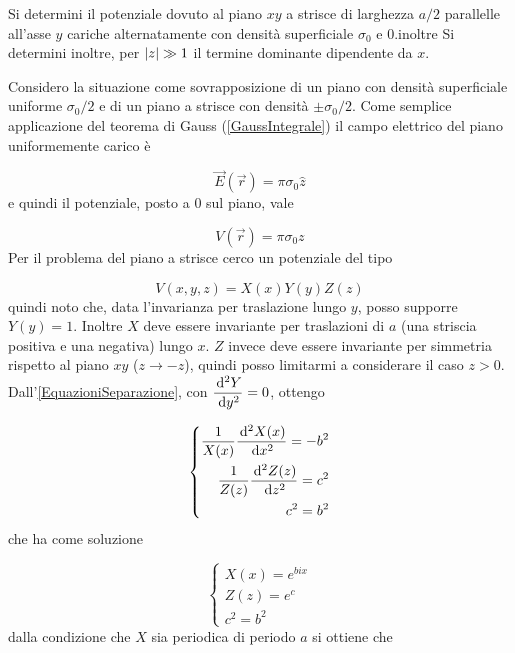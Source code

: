 \documentclass[../main.tex]{subfiles}
\begin{document}

\textex

Si determini il potenziale dovuto al piano $xy$ a strisce di larghezza $a/2$ parallelle all'asse $y$ cariche alternatamente con densità superficiale $\sigma_0$  e $0$.\newline inoltre
Si determini inoltre, per $\lvert z\rvert \gg 1$ il termine dominante dipendente da $x$.

\solution
Considero la situazione come sovrapposizione di un piano con densità superficiale uniforme $\sigma_0/2$ e di un piano a strisce con densità $\pm \sigma_0/2$.
Come semplice applicazione del teorema di Gauss (\cref{GaussIntegrale}) il campo elettrico del piano uniformemente carico è

\begin{equation*}
  \vec E (\vec r)= \pi \sigma_0 \hat z 
\end{equation*}
e quindi il potenziale, posto a $0$ sul piano, vale

\begin{equation}
  \label{pz:potenzialeuniforme}
  V(\vec r)= \pi \sigma_0 z
\end{equation}
Per il problema del piano a strisce cerco un potenziale del tipo

\begin{equation*}
  V(x, y, z)=X(x)Y(y)Z(z)
\end{equation*}
quindi noto che, data l'invarianza per traslazione lungo $y$, posso supporre $Y(y)=1$.
Inoltre $X$ deve essere invariante per traslazioni di $a$ (una striscia positiva e una negativa) lungo $x$.
$Z$ invece deve essere invariante per simmetria rispetto al piano $xy$ ($z \to -z$), quindi posso limitarmi a considerare il caso $z > 0$.
Dall'\cref{EquazioniSeparazione}, con $\displaystyle\frac{\,\mathrm d^2Y}{\,\mathrm d y^2}=0$, ottengo

\begin{equation}
  \left\{
    \begin{aligned}
      \frac{1}{X(x)}\frac{\,\mathrm d^2X(x)}{\,\mathrm d x^2}=-b^2\\
      \frac{1}{Z(z)}\frac{\,\mathrm d^2Z(z)}{\,\mathrm d z^2}=c^2\\
      c^2=b^2
    \end{aligned}
  \right.
\end{equation}
che ha come soluzione 

\begin{equation}
  \left\{
    \begin{aligned}
      X(x)=e^{bix} \\
      Z(z)=e^c \\
      c^2=b^2 
    \end{aligned}
  \right.
\end{equation}
dalla condizione che $X$ sia periodica di periodo $a$ si ottiene che
\end{document}
